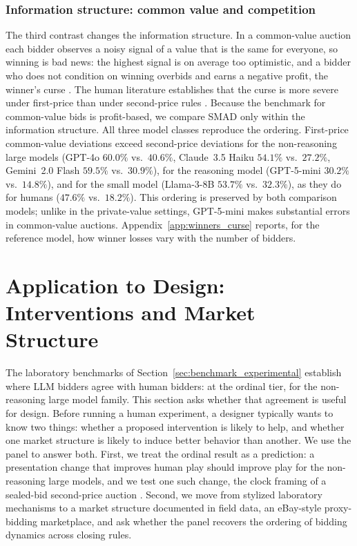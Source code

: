 \documentclass{article} %
\newif\ifmarkrev
\newcommand{\rev}[1]{\ifmarkrev\begingroup\color{red}#1\endgroup\else#1\fi}
\begin{document}
\subsubsection{\texorpdfstring{\rev{Information structure: common value and competition}}{Information structure: common value and competition}}

\rev{The third contrast changes the information structure. In a common-value auction each bidder observes a noisy signal of a value that is the same for everyone, so winning is bad news: the highest signal is on average too optimistic, and a bidder who does not condition on winning overbids and earns a negative profit, the winner's curse \citep{kagel1986winner}. The human literature establishes that the curse is more severe under first-price than under second-price rules \citep{levin1996revenue}. Because the benchmark for common-value bids is profit-based, we compare SMAD only within the information structure. All three model classes reproduce the ordering. First-price common-value deviations exceed second-price deviations for the non-reasoning large models (GPT-4o $60.0\%$ vs.\ $40.6\%$, Claude~3.5 Haiku $54.1\%$ vs.\ $27.2\%$, Gemini~2.0 Flash $59.5\%$ vs.\ $30.9\%$), for the reasoning model (GPT-5-mini $30.2\%$ vs.\ $14.8\%$), and for the small model (Llama-3-8B $53.7\%$ vs.\ $32.3\%$), as they do for humans ($47.6\%$ vs.\ $18.2\%$). This ordering is preserved by both comparison models; unlike in the private-value settings, GPT-5-mini makes substantial errors in common-value auctions. Appendix~\ref{app:winners_curse} reports, for the reference model, how winner losses vary with the number of bidders.}


\section{\texorpdfstring{\rev{Application to Design: Interventions and Market Structure}}{Application to Design: Interventions and Market Structure}}\label{session:ebay}

\rev{The laboratory benchmarks of Section~\ref{sec:benchmark_experimental} establish where LLM bidders agree with human bidders: at the ordinal tier, for the non-reasoning large model family. This section asks whether that agreement is useful for design. Before running a human experiment, a designer typically wants to know two things: whether a proposed intervention is likely to help, and whether one market structure is likely to induce better behavior than another. We use the panel to answer both. First, we treat the ordinal result as a prediction: a presentation change that improves human play should improve play for the non-reasoning large models, and we test one such change, the clock framing of a sealed-bid second-price auction \citep{breitmoser2022obviousness}. Second, we move from stylized laboratory mechanisms to a market structure documented in field data, an eBay-style proxy-bidding marketplace, and ask whether the panel recovers the ordering of bidding dynamics across closing rules.}
\end{document}
